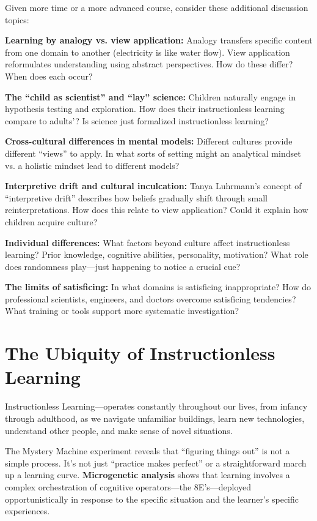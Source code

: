 \documentclass[12pt,letterpaper]{article}
\begin{document}
Given more time or a more advanced course, consider these additional discussion topics:

\textbf{Learning by analogy vs. view application:} Analogy transfers specific content from one domain to another (electricity is like water flow). View application reformulates understanding using abstract perspectives. How do these differ? When does each occur?

\textbf{The ``child as scientist'' and ``lay'' science:} Children naturally engage in hypothesis testing and exploration. How does their instructionless learning compare to adults'? Is science just formalized instructionless learning?

\textbf{Cross-cultural differences in mental models:} Different cultures provide different ``views'' to apply. In what sorts of setting might an analytical mindset vs. a holistic mindset lead to different models?

\textbf{Interpretive drift and cultural inculcation:} Tanya Luhrmann's concept of ``interpretive drift'' describes how beliefs gradually shift through small reinterpretations.\cite{luhrmann1989_persuasion_witches_craft} How does this relate to view application? Could it explain how children acquire culture?

\textbf{Individual differences:} What factors beyond culture affect instructionless learning? Prior knowledge, cognitive abilities, personality, motivation? What role does randomness play—just happening to notice a crucial cue?

\textbf{The limits of satisficing:} In what domains is satisficing inappropriate? How do professional scientists, engineers, and doctors overcome satisficing tendencies? What training or tools support more systematic investigation?

\section{The Ubiquity of Instructionless Learning}

Instructionless Learning—operates constantly throughout our lives, from infancy through adulthood, as we navigate unfamiliar buildings, learn new technologies, understand other people, and make sense of novel situations.

The Mystery Machine experiment reveals that ``figuring things out'' is not a simple process. It's not just ``practice makes perfect'' or a straightforward march up a learning curve. \textbf{Microgenetic analysis} shows that learning involves a complex orchestration of cognitive operators—the 8E's—deployed opportunistically in response to the specific situation and the learner's specific experiences.
\end{document}
